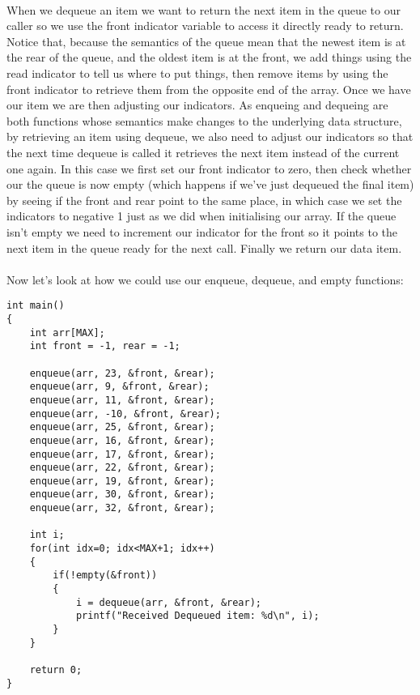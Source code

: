 \documentclass[10pt, a4paper, twosize]{article}
\begin{document}
\paragraph{} When we dequeue an item we want to return the next item in the queue to our caller so we use the front indicator variable to access it directly ready to return. Notice that, because the semantics of the queue mean that the newest item is at the rear of the queue, and the oldest item is at the front, we add things using the read indicator to tell us where to put things, then remove items by using the front indicator to retrieve them from the opposite end of the array. Once we have our item we are then adjusting our indicators. As enqueing and dequeing are both functions whose semantics make changes to the underlying data structure, by retrieving an item using dequeue, we also need to adjust our indicators so that the next time dequeue is called it retrieves the next item instead of the current one again. In this case we first set our front indicator to zero, then check whether our the queue is now empty (which happens if we've just dequeued the final item) by seeing if the front and rear point to the same place, in which case we set the indicators to negative 1 just as we did when initialising our array. If the queue isn't empty we need to increment our indicator for the front so it points to the next item in the queue ready for the next call. Finally we return our data item.

\paragraph{} Now let's look at how we could use our enqueue, dequeue, and empty functions:

\begin{lstlisting}
int main()
{
    int arr[MAX];
    int front = -1, rear = -1;

    enqueue(arr, 23, &front, &rear);
    enqueue(arr, 9, &front, &rear);
    enqueue(arr, 11, &front, &rear);
    enqueue(arr, -10, &front, &rear);
    enqueue(arr, 25, &front, &rear);
    enqueue(arr, 16, &front, &rear);
    enqueue(arr, 17, &front, &rear);
    enqueue(arr, 22, &front, &rear);
    enqueue(arr, 19, &front, &rear);
    enqueue(arr, 30, &front, &rear);
    enqueue(arr, 32, &front, &rear);

    int i;
    for(int idx=0; idx<MAX+1; idx++)
    {
        if(!empty(&front))
        {
            i = dequeue(arr, &front, &rear);
            printf("Received Dequeued item: %d\n", i);
        }
    }

    return 0;
}
\end{lstlisting}
\end{document}
